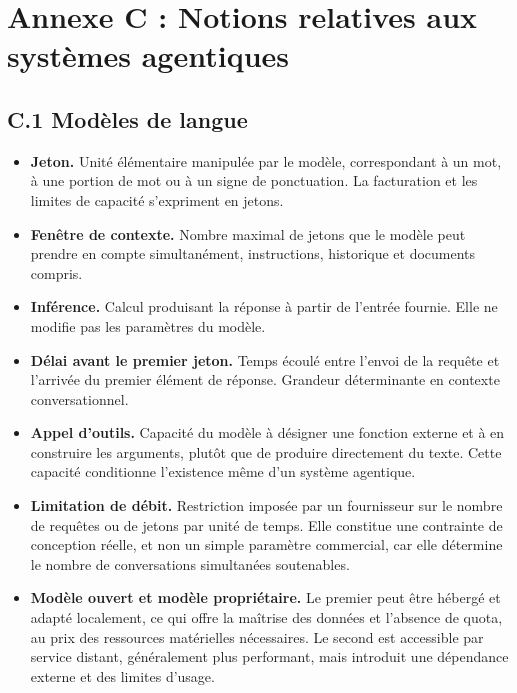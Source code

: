 \newpage

\chapter*{Annexe C : Notions relatives aux systèmes agentiques}

\section*{C.1 Modèles de langue}

\begin{itemize}
  \item \textbf{Jeton.} Unité élémentaire manipulée par le modèle, correspondant à un mot, à une portion de mot ou à un signe de ponctuation. La facturation et les limites de capacité s'expriment en jetons.
  \item \textbf{Fenêtre de contexte.} Nombre maximal de jetons que le modèle peut prendre en compte simultanément, instructions, historique et documents compris.
  \item \textbf{Inférence.} Calcul produisant la réponse à partir de l'entrée fournie. Elle ne modifie pas les paramètres du modèle.
  \item \textbf{Délai avant le premier jeton.} Temps écoulé entre l'envoi de la requête et l'arrivée du premier élément de réponse. Grandeur déterminante en contexte conversationnel.
  \item \textbf{Appel d'outils.} Capacité du modèle à désigner une fonction externe et à en construire les arguments, plutôt que de produire directement du texte. Cette capacité conditionne l'existence même d'un système agentique.
  \item \textbf{Limitation de débit.} Restriction imposée par un fournisseur sur le nombre de requêtes ou de jetons par unité de temps. Elle constitue une contrainte de conception réelle, et non un simple paramètre commercial, car elle détermine le nombre de conversations simultanées soutenables.
  \item \textbf{Modèle ouvert et modèle propriétaire.} Le premier peut être hébergé et adapté localement, ce qui offre la maîtrise des données et l'absence de quota, au prix des ressources matérielles nécessaires. Le second est accessible par service distant, généralement plus performant, mais introduit une dépendance externe et des limites d'usage.
\end{itemize}

